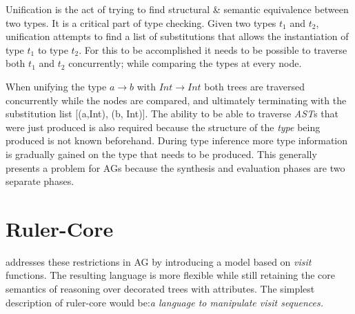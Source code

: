 Unification is the act of trying to find structural \& semantic equivalence between two types. It is a critical part of type checking. Given two types \emph{$t_{1}$} and \emph{$t_{2}$}, unification attempts to find a list of substitutions that allows the instantiation of type \emph{$t_{1}$} to type \emph{$t_{2}$}. For this to be accomplished it needs to be possible to traverse both \emph{$t_{1}$} and \emph{$t_{2}$} concurrently; while comparing the types at every node.

%
%    
%

When unifying the type \emph{$a \rightarrow b$} with \emph{$Int \rightarrow Int$} both trees are traversed concurrently while the nodes are compared, and ultimately terminating with the substitution list [(a,Int), (b, Int)]. The ability to be able to traverse \emph{AST}s that were just produced is also required because the structure of the \emph{type} being produced is not known beforehand. During type inference more type information is gradually gained on the type that needs to be produced. This generally presents a problem for AGs\cite{ruler-front} because the synthesis and evaluation phases are two separate phases.

\section{Ruler-Core}
\Rcore addresses these restrictions in AG by introducing a model based on \emph{visit}\cite{visits} functions. The resulting language is more flexible while still retaining the core semantics of reasoning over decorated trees with attributes. The simplest description of ruler-core would be:\emph{a language to manipulate visit sequences.}


